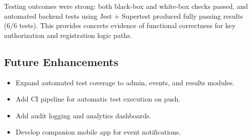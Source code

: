 \documentclass[12pt, a4paper]{article}
\begin{document}
Testing outcomes were strong: both black-box and white-box checks passed, and automated backend tests using Jest + Supertest produced fully passing results (6/6 tests). This provides concrete evidence of functional correctness for key authorization and registration logic paths.

\subsection{Future Enhancements}
\begin{itemize}
    \item Expand automated test coverage to admin, events, and results modules.
    \item Add CI pipeline for automatic test execution on push.
    \item Add audit logging and analytics dashboards.
    \item Develop companion mobile app for event notifications.
\end{itemize}
\end{document}
